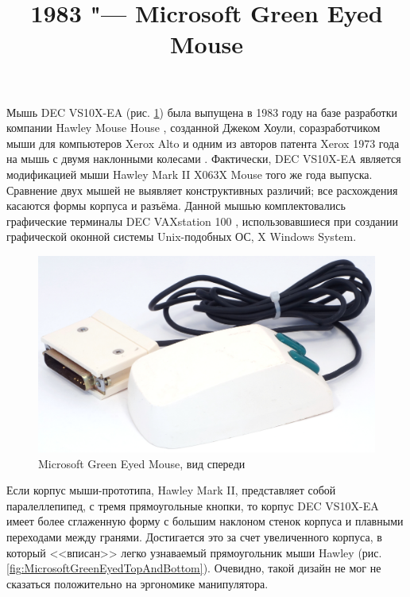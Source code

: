 \documentclass[11pt, a4paper]{article}
\begin{document}
\title{1983 "--- Microsoft Green Eyed Mouse}
\date{}
\maketitle
{}
Мышь DEC VS10X-EA (рис. \ref{fig:MicrosoftGreenEyedPic}) была выпущена в 1983 году на базе разработки компании Hawley Mouse House \cite{hawley,mouses}, созданной Джеком Хоули, соразработчиком мыши для компьютеров Xerox Alto и одним из авторов патента Xerox 1973 года на мышь с двумя наклонными колесами \cite{pat}. Фактически, DEC VS10X-EA является модификацией мыши Hawley Mark II X063X Mouse того же года выпуска. Сравнение двух мышей не выявляет конструктивных различий; все расхождения касаются формы корпуса и разъёма. Данной мышью комплектовались графические терминалы DEC VAXstation 100 \cite{reddit}, использовавшиеся при создании графической оконной системы Unix-подобных ОС, X Windows System.

\begin{figure}[h]
   \centering
    \includegraphics[scale=0.6]{1983_microsoft_green_eyed_mouse/pic_30.jpg}
    \caption{Microsoft Green Eyed Mouse, вид спереди}
    \label{fig:MicrosoftGreenEyedPic}
\end{figure}

Если корпус мыши-прототипа, Hawley Mark II, представляет собой паралеллепипед, с тремя прямоугольные кнопки, то корпус DEC VS10X-EA имеет более сглаженную форму с большим наклоном стенок корпуса и плавными переходами между гранями. Достигается это за счет увеличенного корпуса, в который <<вписан>> легко узнаваемый прямоугольник мыши Hawley (рис. \ref{fig:MicrosoftGreenEyedTopAndBottom}). Очевидно, такой дизайн не мог не сказаться положительно на эргономике манипулятора.
\end{document}
